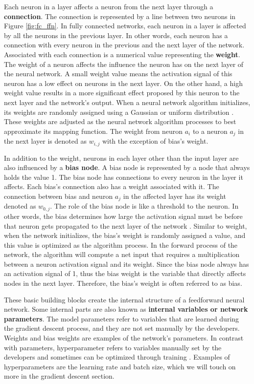 Each neuron in a layer affects a neuron from the next layer through a \textbf{connection}. The connection is represented by a line between two neurons in Figure \ref{fig:fc_ffn}. In fully connected networks, each neuron in a layer is affected by all the neurons in the previous layer. In other words, each neuron has a connection with every neuron in the previous and the next layer of the network. Associated with each connection is a numerical value representing the \textbf{weight}. The weight of a neuron affects the influence the neuron has on the next layer of the neural network. A small weight value means the activation signal of this neuron has a low effect on neurons in the next layer. On the other hand, a high weight value results in a more significant effect proposed by this neuron to the next layer and the network's output. When a neural network algorithm initializes, its weights are randomly assigned using a Gaussian or uniform distribution \cite{lecun2015deep}. These weights are adjusted as the neural network algorithm processes to best approximate its mapping function. The weight from neuron $a_i$ to a neuron $a_j$ in the next layer is denoted as $w_{i,j}$ with the exception of bias's weight.

In addition to the weight, neurons in each layer other than the input layer are also influenced by a \textbf{bias node}. A bias node is represented by a node that always holds the value 1. The bias node has connections to every neuron in the layer it affects. Each bias's connection also has a weight associated with it. The connection between bias and neuron $a_j$ in the affected layer has its weight denoted as $w_{0,j}$. The role of the bias node is like a threshold to the neuron. In other words, the bias determines how large the activation signal must be before that neuron gets propagated to the next layer of the network \cite{taylor2017neural}. Similar to weight, when the network initializes, the bias's weight is randomly assigned a value, and this value is optimized as the algorithm process. In the forward process of the network, the algorithm will compute a net input that requires a multiplication between a neuron activation signal and its weight. Since the bias node always has an activation signal of 1, thus the bias weight is the variable that directly affects nodes in the next layer. Therefore, the bias's weight is often referred to as bias.

These basic building blocks create the internal structure of a feedforward neural network. Some internal parts are also known as \textbf{internal variables or network parameters}. The model parameters refer to variables that are learned during the gradient descent process, and they are not set manually by the developers. Weights and bias weights are examples of the network's parameters. In contrast with parameters, hyperparameter refers to variables manually set by the developers and sometimes can be optimized through training \cite{lecun2015deep}. Examples of hyperparameters are the learning rate and batch size, which we will touch on more in the gradient descent section.

